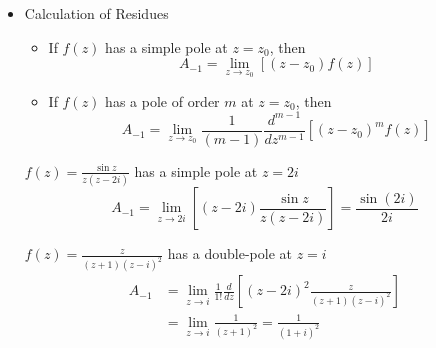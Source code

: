 \begin{itemize}
\item Calculation of Residues
\begin{itemize}
\item If $f(z)$ has a simple pole at $z=z_0$, then 
\begin{equation}
A_{-1} = \lim_{z\to z_0}\left[\left(z-z_0\right)f(z)\right]
\label{eq: 5-1-18}
\end{equation}
\item If $f(z)$ has a pole of order $m$ at $z=z_0$, then 
\begin{equation}
A_{-1} = \lim_{z\to z_0}\frac{1}{\left(m-1\right)}\frac{d^{m-1}}{dz^{m-1}}\left[\left(z-z_0\right)^mf(z)\right]
\label{eq: 5-1-19}
\end{equation}
\end{itemize}
\begin{example}{$\displaystyle f(z) = \frac{\sin z}{z\left(z-2i\right)}$ has a simple pole at $z=2i$} 
\[
A_{-1} = \lim_{z\to 2i}\left[\left(z-2i\right)\frac{\sin z}{z\left(z-2i\right)}\right] = \frac{\sin(2i)}{2i}
\]
\end{example}
\begin{example}{$\displaystyle f(z) = \frac{ z}{\left(z+1\right)\left(z-i\right)^2}$ has a double-pole at $z=i$} 
\begin{align*}
A_{-1} 
&= \lim_{z\to i}\frac{1}{1!}\frac{d}{dz}\left[\left(z-2i\right)^2\frac{z}{\left(z+1\right)\left(z-i\right)^2}\right]\\ 
&= \lim_{z\to i}\frac{1}{\left(z+1\right)^2} = \frac{1}{\left(1+i\right)^2}
\end{align*}

\end{example}
\end{itemize}
